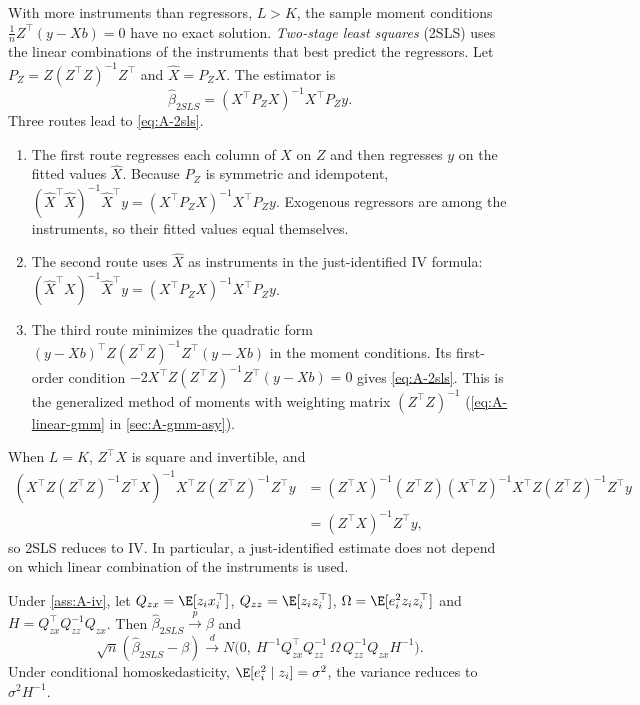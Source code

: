 With more instruments than regressors, $L > K$, the sample moment conditions $\frac{1}{n}Z^\top(y - Xb) = 0$ have
no exact solution. \emph{Two-stage least squares} (2SLS) uses the linear combinations of the instruments that
best predict the regressors. Let $P_Z = Z(Z^\top Z)^{-1}Z^\top$ and $\hat X = P_ZX$. The estimator is
\begin{equation}\label{eq:A-2sls}
\hat\beta_{2SLS} = (X^\top P_ZX)^{-1}X^\top P_Zy .
\end{equation}
Three routes lead to \eqref{eq:A-2sls}.
\begin{enumerate}[label=(\alph*)]
\item The first route regresses each column of $X$ on $Z$ and then regresses $y$ on the fitted values $\hat X$.
  Because $P_Z$ is symmetric and idempotent, $(\hat X^\top\hat X)^{-1}\hat X^\top y = (X^\top P_ZX)^{-1}X^\top P_Zy$.
  Exogenous regressors are among the instruments, so their fitted values equal themselves.
\item The second route uses $\hat X$ as instruments in the just-identified IV formula:
  $(\hat X^\top X)^{-1}\hat X^\top y = (X^\top P_ZX)^{-1}X^\top P_Zy$.
\item The third route minimizes the quadratic form $(y - Xb)^\top Z(Z^\top Z)^{-1}Z^\top(y - Xb)$ in the moment
  conditions. Its first-order condition $-2X^\top Z(Z^\top Z)^{-1}Z^\top(y - Xb) = 0$ gives \eqref{eq:A-2sls}. This is
  the generalized method of moments with weighting matrix $(Z^\top Z)^{-1}$ (\cref{eq:A-linear-gmm} in \cref{sec:A-gmm-asy}).
\end{enumerate}
When $L = K$, $Z^\top X$ is square and invertible, and
\begin{align*}
(X^\top Z(Z^\top Z)^{-1}Z^\top X)^{-1}X^\top Z(Z^\top Z)^{-1}Z^\top y
&= (Z^\top X)^{-1}(Z^\top Z)(X^\top Z)^{-1}X^\top Z(Z^\top Z)^{-1}Z^\top y \\
&= (Z^\top X)^{-1}Z^\top y ,
\end{align*}
so 2SLS reduces to IV. In particular, a just-identified estimate does not depend on which linear
combination of the instruments is used.

\begin{proposition}\label{prop:A-2sls-asy}
Under \cref{ass:A-iv}, let $Q_{zx} = \E[z_ix_i^\top]$, $Q_{zz} = \E[z_iz_i^\top]$, $\Omega = \E[e_i^2z_iz_i^\top]$ and
$H = Q_{zx}^\top Q_{zz}^{-1}Q_{zx}$. Then $\hat\beta_{2SLS} \xrightarrow{p} \beta$ and
\begin{equation}\label{eq:A-2sls-avar}
\sqrt{n}(\hat\beta_{2SLS} - \beta) \xrightarrow{d}
N\bigl(0,\ H^{-1}Q_{zx}^\top Q_{zz}^{-1}\,\Omega\,Q_{zz}^{-1}Q_{zx}H^{-1}\bigr) .
\end{equation}
Under conditional homoskedasticity, $\E[e_i^2 \mid z_i] = \sigma^2$, the variance reduces to $\sigma^2H^{-1}$.
\end{proposition}

